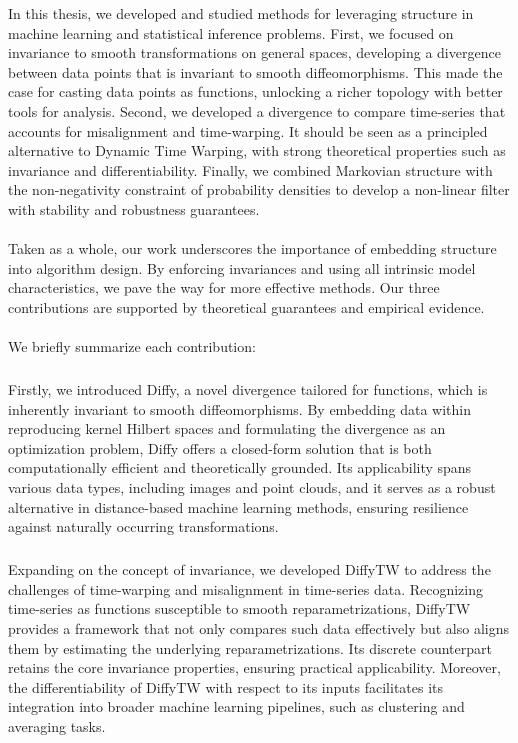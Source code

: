 
In this thesis, we developed and studied methods for leveraging structure in machine learning and statistical inference problems. First, we focused on invariance to smooth transformations on general spaces, developing a divergence between data points that is invariant to smooth diffeomorphisms. This made the case for casting data points as functions, unlocking a richer topology with better tools for analysis. Second, we developed a divergence to compare time-series that accounts for misalignment and time-warping. It should be seen as a principled alternative to Dynamic Time Warping, with strong theoretical properties such as invariance and differentiability. Finally, we combined Markovian structure with the non-negativity constraint of probability densities to develop a non-linear filter with stability and robustness guarantees.

\paragraph{} Taken as a whole, our work underscores the importance of embedding structure into algorithm design. By enforcing invariances and using all intrinsic model characteristics, we pave the way for more effective methods. Our three contributions are supported by theoretical guarantees and empirical evidence.

\paragraph{}\noindent We briefly summarize each contribution:

\subparagraph{} Firstly, we introduced Diffy, a novel divergence tailored for functions, which is inherently invariant to smooth diffeomorphisms. By embedding data within reproducing kernel Hilbert spaces and formulating the divergence as an optimization problem, Diffy offers a closed-form solution that is both computationally efficient and theoretically grounded. Its applicability spans various data types, including images and point clouds, and it serves as a robust alternative in distance-based machine learning methods, ensuring resilience against naturally occurring transformations.

\subparagraph{}Expanding on the concept of invariance, we developed DiffyTW to address the challenges of time-warping and misalignment in time-series data. Recognizing time-series as functions susceptible to smooth reparametrizations, DiffyTW provides a framework that not only compares such data effectively but also aligns them by estimating the underlying reparametrizations. Its discrete counterpart retains the core invariance properties, ensuring practical applicability. Moreover, the differentiability of DiffyTW with respect to its inputs facilitates its integration into broader machine learning pipelines, such as clustering and averaging tasks.

